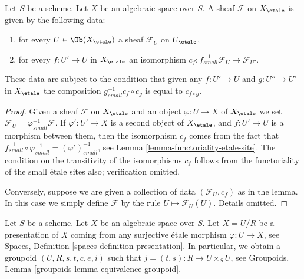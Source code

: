 \begin{lemma}
\label{lemma-characterize-sheaf-small-etale}
Let $S$ be a scheme. Let $X$ be an algebraic space over $S$.
A sheaf $\mathcal{F}$ on $X_\etale$ is given by the following data:
\begin{enumerate}
\item for every $U \in \Ob(X_\etale)$ a sheaf
$\mathcal{F}_U$ on $U_\etale$,
\item for every $f : U' \to U$ in $X_\etale$ an isomorphism
$c_f : f_{small}^{-1}\mathcal{F}_U \to \mathcal{F}_{U'}$.
\end{enumerate}
These data are subject to the condition that given any $f : U' \to U$
and $g : U'' \to U'$ in $X_\etale$ the composition
$g_{small}^{-1}c_f \circ c_g$ is equal to $c_{f \circ g}$.
\end{lemma}

\begin{proof}
Given a sheaf $\mathcal{F}$ on $X_\etale$ and an object
$\varphi : U \to X$ of
$X_\etale$ we set $\mathcal{F}_U = \varphi_{small}^{-1}\mathcal{F}$.
If $\varphi' : U' \to X$ is a second object of $X_\etale$, and
$f : U' \to U$ is a morphism between them, then
the isomorphism $c_f$ comes from the fact that
$f_{small}^{-1} \circ \varphi_{small}^{-1} = (\varphi')^{-1}_{small}$, see
Lemma \ref{lemma-functoriality-etale-site}. The condition on the
transitivity of the isomorphisms $c_f$ follows from the functoriality
of the small \'etale sites also; verification omitted.

\medskip\noindent
Conversely, suppose we are given a collection of data $(\mathcal{F}_U, c_f)$
as in the lemma. In this case we simply define $\mathcal{F}$ by the rule
$U \mapsto \mathcal{F}_U(U)$. Details omitted.
\end{proof}

\noindent
Let $S$ be a scheme. Let $X$ be an algebraic space over $S$.
Let $X = U/R$ be a presentation of $X$ coming from any surjective
\'etale morphism $\varphi : U \to X$, see
Spaces, Definition \ref{spaces-definition-presentation}.
In particular, we obtain a groupoid $(U, R, s, t, c, e, i)$ such that
$j = (t, s) : R \to U \times_S U$, see
Groupoids, Lemma \ref{groupoids-lemma-equivalence-groupoid}.

